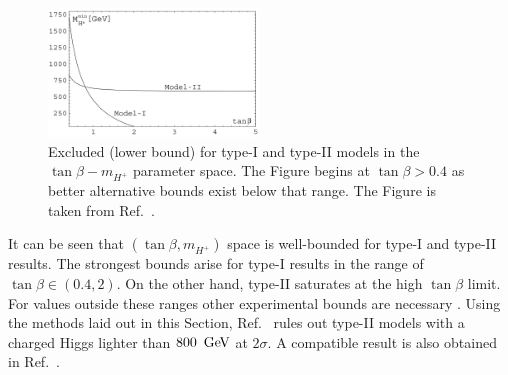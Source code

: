 \begin{figure}[hbtp!]
    \centering
        \includegraphics[width=0.5\textwidth]{figures/theory/xsgamma_2hdm_both_types.png}
    \caption{\label{fig:2hdm_limits} 
    Excluded (lower bound) for type-I and type-II \TwoHDM models in the $\tan\beta-m_{H^+}$ parameter space.
    The Figure begins at $\tan\beta>0.4$ as better alternative bounds exist below that range.
    The Figure is taken from Ref.~\cite{Misiak:2017bgg}.}
\end{figure}

It can be seen that $(\tan\beta,m_{H^+})$ space is well-bounded for type-I and type-II \TwoHDM results.
The strongest bounds arise for type-I \TwoHDM results in the range of $\tan\beta\in(0.4,2)$.
On the other hand, type-II \TwoHDM saturates at the high $\tan\beta$ limit.
For values outside these ranges other experimental bounds are necessary \cite{Misiak:2017bgg}.
Using the methods laid out in this Section, Ref.~\cite{Misiak:2020vlo} rules out type-II \TwoHDM models with a charged Higgs lighter than $800~\mathrm{\,Ge\kern -0.1em V}$ at $2\sigma$.
A compatible result is also obtained in Ref.~\cite{Atkinson:2021eox}.